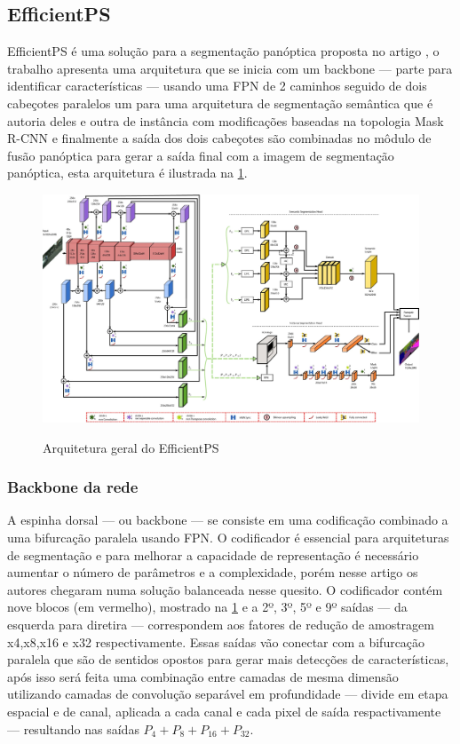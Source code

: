 \subsection{EfficientPS}

EfficientPS é uma solução para a segmentação panóptica proposta no artigo , o trabalho apresenta uma arquitetura que se inicia com um backbone — parte para identificar características — usando uma FPN de 2 caminhos seguido de dois cabeçotes paralelos um para uma arquitetura de segmentação semântica que é autoria deles e outra de instância com modificações baseadas na topologia Mask R-CNN e finalmente a saída dos dois cabeçotes são combinadas no môdulo de fusão panóptica para gerar a saída final com a imagem de segmentação panóptica, esta arquitetura é ilustrada na \cref{fig:arqEP}.

\begin{figure}[H]
	\caption{Arquitetura geral do EfficientPS}
	\centering %
	\includegraphics[width=15cm]{figures/arqEP.jpg} %
	\label{fig:arqEP}
\end{figure}

\subsubsection*{Backbone da rede}

A espinha dorsal — ou backbone — se consiste em uma codificação combinado a uma bifurcação paralela usando FPN. O codificador é essencial para arquiteturas de segmentação e para melhorar a capacidade de representação é necessário aumentar o número de parâmetros e a complexidade, porém nesse artigo os autores chegaram numa solução balanceada nesse quesito. O codificador contém nove blocos (em vermelho), mostrado na \cref{fig:arqEP} e a 2º, 3º, 5º e 9º saídas — da esquerda para diretira — correspondem aos fatores de redução de amostragem x4,x8,x16 e x32 respectivamente. Essas saídas vão conectar com a bifurcação paralela que são de sentidos opostos para gerar mais detecções de características, após isso será feita uma combinação entre camadas de mesma dimensão utilizando camadas de convolução separável em profundidade — divide em etapa espacial e de canal, aplicada a cada canal e cada pixel de saída respactivamente — resultando nas saídas $ P_4 + P_8 + P_{16} + P_{32} $\cite{mohan2020efficientps, redes-neurais-convolucionais-separaveis-em-profundidade}.

